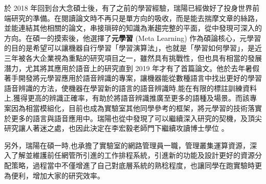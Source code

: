 \documentclass[12pt,UTF8,fntef]{article}
\begin{document}
於 2018 年回到台大念碩士後，有了之前的學習經驗，瑞陽已經做好了投身世界前端研究的準備。在閱讀論文時不再只是單方向的吸收，而是能去揣摩文章的絲路，並能連結其他相關的論文，串接瑣碎的知識為漸趨完整的平面，從中發現可深入的方向。在碩一的摸索後，他選擇了\textbf{元學習} (Meta Learning) 作為碩論核心，元學習的目的是希望可以讓機器自行學習「學習演算法」，也就是「學習如何學習」，是近三年被各大企業視為重點的研究項目之一，雖然具有挑戰性，但也具有相當的發展潛力，尤其將其應用於語音上的研究直到 2019 年才有了首篇論文。他於去年暑假著手開發將元學習應用於語音辨識的專案，讓機器能從數種語言中找出更好的學習語音辨識的方法，使機器在學習新的語言的語音辨識時,能在有限的標註訓練資料上,獲得更高的辨識正確率，有助於將語音辨識推廣至更多的語種及場景。而該專案因為相當模組化，目前也成為實驗室其他同學參考的框架，將元學習的技術落實於更多的語言與語音應用中。瑞陽也從中發現了可以繼續深入研究的契機，及頂尖研究讓人著迷之處，也因此決定在李宏毅老師門下繼續攻讀博士學位
。

\vspace{1.5em}

另外，瑞陽在碩一時,也承擔了實驗室的網路管理員一職，管理叢集運算資源，深入了解並維護前任網管所引進的工作排程系統，引進新的功能及設計更好的資源分配策略，過程當中不僅增進了自己對底層系統的熟稔程度，也讓同學在跑實驗時更為便利，增加大家的研究效率。
\end{document}
